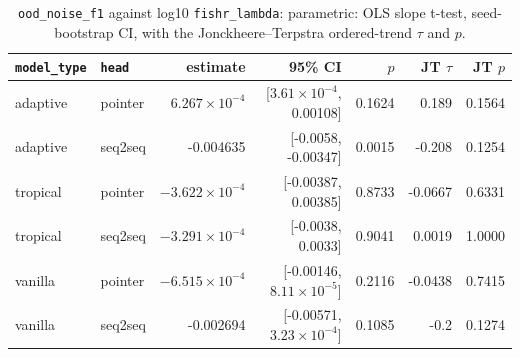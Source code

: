\documentclass[10pt]{article}
\begin{document}
{\small
\begin{longtable}{llrrrrr}
\caption{\texttt{ood\_noise\_f1} against log10 \texttt{fishr\_lambda}: parametric: OLS slope t-test, seed-bootstrap CI, with the Jonckheere--Terpstra ordered-trend $\tau$ and $p$.}\label{tab:trend-ood_noise_f1}\\
\toprule
\texttt{model\_type} & \texttt{head} & estimate & 95\% CI & $p$ & JT $\tau$ & JT $p$\\
\midrule
\endhead
adaptive & pointer & $6.267\times10^{-4}$ & [$3.61\times10^{-4}$, 0.00108] & 0.1624 & 0.189 & 0.1564\\
adaptive & seq2seq & -0.004635 & [-0.0058, -0.00347] & 0.0015 & -0.208 & 0.1254\\
tropical & pointer & $-3.622\times10^{-4}$ & [-0.00387, 0.00385] & 0.8733 & -0.0667 & 0.6331\\
tropical & seq2seq & $-3.291\times10^{-4}$ & [-0.0038, 0.0033] & 0.9041 & 0.0019 & 1.0000\\
vanilla & pointer & $-6.515\times10^{-4}$ & [-0.00146, $8.11\times10^{-5}$] & 0.2116 & -0.0438 & 0.7415\\
vanilla & seq2seq & -0.002694 & [-0.00571, $3.23\times10^{-4}$] & 0.1085 & -0.2 & 0.1274\\
\bottomrule
\end{longtable}
}
\end{document}
